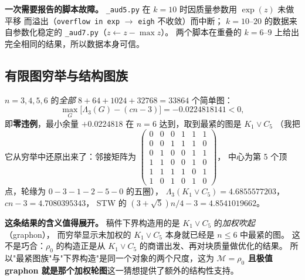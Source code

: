 \documentclass[UTF8,11pt]{ctexart}
\theoremstyle{definition}
\begin{document}
\textbf{一次需要报告的脚本故障。} \texttt{\_aud5.py} 在 $k=10$ 时因质量参数用 $\exp(z)$ 未做平移
而溢出（\texttt{overflow in exp} $\to$ \texttt{eigh} 不收敛）而中断；
$k=10$--$20$ 的数据来自参数化稳定的 \texttt{\_aud7.py}（$z\leftarrow z-\max z$）。
两个脚本在重叠的 $k=6$--$9$ 上给出完全相同的结果，所以数据本身可信。

\subsection{有限图穷举与结构图族}

$n=3,4,5,6$ 的\emph{全部} $8+64+1024+32768=33864$ 个简单图：
\[
 \max_G\bigl[\Lambda_3(G)-(cn-3)\bigr]=-0.0224818141<0,
\]
即\textbf{零违例}，最小余量 $+0.0224818$ 在 $n=6$ 达到，取到最紧的图是 $K_1\vee C_5$
（我把它从穷举中还原出来了：邻接矩阵为
$\left(\begin{smallmatrix}0&0&0&1&1&1\\0&0&1&1&1&0\\0&1&0&0&1&1\\1&1&0&0&1&0\\1&1&1&1&0&1\\1&0&1&0&1&0\end{smallmatrix}\right)$，
中心为第 5 个顶点，轮缘为 $0\!-\!3\!-\!1\!-\!2\!-\!5\!-\!0$ 的五圈），
$\Lambda_3(K_1\vee C_5)=4.6855577203$，$cn-3=4.7080395343$，
STW 的 $(3+\sqrt5)n/4-3=4.8541019662$。

\textbf{这条结果的含义值得展开。} 稿件下界构造用的是 $K_1\vee C_5$ 的\emph{加权吹起}（graphon），
而穷举显示未加权的 $K_1\vee C_5$ 本身就已经是 $n\le6$ 中最紧的图。
这不是巧合：$\rho_0$ 的构造正是从 $K_1\vee C_5$ 的商谱出发、再对块质量做优化的结果。
所以"最紧图族"与"下界构造"是同一个对象的两个尺度，这为
\textbf{$\mathcal M=\rho_0$ 且极值 graphon 就是那个加权轮图}这一猜想提供了额外的结构性支持。
\end{document}
